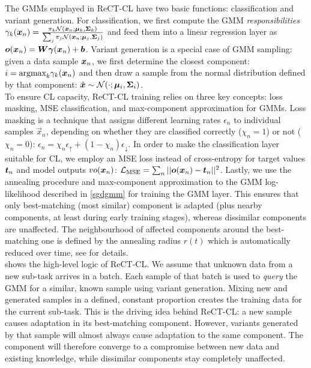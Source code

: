 \documentclass{article} %
\newcommand{\vgamma}{{\bm \gamma}}
\begin{document}
The GMMs emplayed in ReCT-CL have two basic functions: classification and variant generation.
For classification, 
we first compute the GMM \textit{responsibilities} $\gamma_k({\bm{x}}_n) = \frac{\pi_k\mathcal N({\bm{x}}_n; {\bm{\mu}}_k,{\bm{\Sigma}}_k)}{\sum_j \pi_j \mathcal N({\bm{x}}_n; {\bm{\mu}}_j,{\bm{\Sigma}}_j)}$ and feed them into a linear regression layer as $\vo(\vx_n) = \mW\vgamma(\vx_n) + \vb$.
Variant generation is a special case of GMM sampling: given a data sample ${\bm{x}}_n$, we first determine the closest component: $i = \text{argmax}_k \gamma_k({\bm{x}}_n)$ and then draw a sample from the normal distribution defined by that component: $\hat {{\bm{x}}} \sim \mathcal N(\cdot; {\bm{\mu}}_i, {\bm{\Sigma}}_i)$.
\\
To ensure CL capacity, ReCT-CL training relies on three key concepts: loss masking, MSE classification, and max-component approximation for GMMs. 
Loss masking is a technique that assigns different learning rates $\epsilon_n$ to individual samples $\vec x_n$, depending on whether they are classified correctly ($\chi_n = 1$) or not ($\chi_n = 0$): 
$\epsilon_n = \chi_n\epsilon_\uparrow + (1-\chi_n)\epsilon_{\downarrow}$.
In order to make the classification layer suitable for CL, we employ an MSE loss instead of cross-entropy for target values ${\bm{t}}_n$ and model outputs $vo({\bm{x}}_n)$: $\mathcal L_\text{MSE} = \sum_n ||{\bm{o}}({\bm{x}}_n)-{\bm{t}}_n||^2$. %
Lastly, we use the annealing procedure and max-component approximation to the GMM log-likelihood described in \cref{sgdgmm} for training the GMM layer. This ensures that only best-matching (most similar) component is adapted (plus nearby components, at least during early training stages), whereas dissimilar components are unaffected. The neighbourhood of affected components around the best-matching one is defined by the annealing radius $r(t)$ which is automatically reduced over time, see \cite{sgdgmm} for details.
\\
 shows the high-level logic of ReCT-CL. We assume that unknown data from a new sub-task arrives in a batch. 
Each sample of that batch is used to \textit{query} the GMM for a similar, known sample using variant generation. Mixing new and generated samples in a defined, constant proportion creates the training data for the current sub-task. 
This is the driving idea behind ReCT-CL: 
a new sample causes adaptation in its best-matching component. However, variants generated by that sample will almost always cause adaptation to the same component. The component will therefore converge to a compromise between new data and existing knowledge, while
dissimilar components stay completely unaffected. 
%
\end{document}
